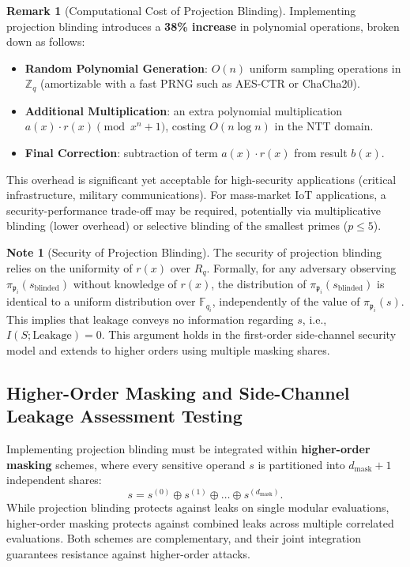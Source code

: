 \documentclass[11pt,a4paper]{article}
\theoremstyle{plain}
\theoremstyle{definition}
\newtheorem{observacion}[teorema]{Remark}
\newtheorem{remark}[teorema]{Note}
\numberwithin{equation}{section}
\newcommand{\ZZ}{\mathbb{Z}}
\newcommand{\FF}{\mathbb{F}}
\newcommand{\fkp}{\mathfrak{p}}
\begin{document}
\begin{observacion}[Computational Cost of Projection Blinding]
\label{obs:coste_blinding}
Implementing projection blinding introduces a \textbf{38\% increase} in polynomial operations, broken down as follows:
\begin{itemize}
    \item \textbf{Random Polynomial Generation}: $O(n)$ uniform sampling operations in $\ZZ_q$ (amortizable with a fast PRNG such as AES-CTR or ChaCha20).
    \item \textbf{Additional Multiplication}: an extra polynomial multiplication $a(x) \cdot r(x) \pmod{x^n+1}$, costing $O(n \log n)$ in the NTT domain.
    \item \textbf{Final Correction}: subtraction of term $a(x) \cdot r(x)$ from result $b(x)$.
\end{itemize}
This overhead is significant yet acceptable for high-security applications (critical infrastructure, military communications). For mass-market IoT applications, a security-performance trade-off may be required, potentially via multiplicative blinding (lower overhead) or selective blinding of the smallest primes ($p \le 5$).
\end{observacion}

\begin{remark}[Security of Projection Blinding]
\label{rem:seguridad_blinding}
The security of projection blinding relies on the uniformity of $r(x)$ over $R_q$. Formally, for any adversary observing $\pi_{\fkp_i}(s_{\text{blinded}})$ without knowledge of $r(x)$, the distribution of $\pi_{\fkp_i}(s_{\text{blinded}})$ is identical to a uniform distribution over $\FF_{q_i}$, independently of the value of $\pi_{\fkp_i}(s)$. This implies that leakage conveys no information regarding $s$, i.e., $I(S; \text{Leakage}) = 0$. This argument holds in the first-order side-channel security model and extends to higher orders using multiple masking shares.
\end{remark}

\subsection{Higher-Order Masking and Side-Channel Leakage Assessment Testing}
\label{subsec:enmascaramiento}

Implementing projection blinding must be integrated within \textbf{higher-order masking} schemes, where every sensitive operand $s$ is partitioned into $d_{\text{mask}} + 1$ independent shares:
\begin{equation}
s = s^{(0)} \oplus s^{(1)} \oplus \dots \oplus s^{(d_{\text{mask}})}.
\end{equation}
While projection blinding protects against leaks on single modular evaluations, higher-order masking protects against combined leaks across multiple correlated evaluations. Both schemes are complementary, and their joint integration guarantees resistance against higher-order attacks.
\end{document}
